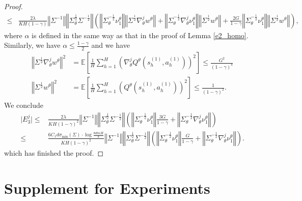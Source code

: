 \documentclass{article}
\numberwithin{equation}{section}
\begin{document}
\begin{proof}
\begin{align*}
    \leq&\frac{2\lambda}{KH(1-\gamma)}\left\Vert\Sigma^{-1}\right\Vert\left\Vert\Sigma_\theta^{\frac{1}{2}}\Sigma^{-\frac{1}{2}}\right\Vert\left(\left\Vert\Sigma_\theta^{-\frac{1}{2}}\nu^\theta_1\right\Vert\left\Vert\Sigma^{\frac{1}{2}}\nabla_\theta^j w^\theta\right\Vert+\left\Vert\Sigma_\theta^{-\frac{1}{2}}\nabla_\theta^j\nu^\theta_1\right\Vert\left\Vert\Sigma^{\frac{1}{2}}w^\theta\right\Vert+\frac{2G}{1-\gamma}\left\Vert\Sigma_\theta^{-\frac{1}{2}}\nu^\theta_1\right\Vert\left\Vert\Sigma^{\frac{1}{2}}w^\theta\right\Vert\right),
\end{align*}
where $\alpha$ is defined in the same way as that in the proof of Lemma \ref{e2_homo}. Similarly, we have $\alpha\leq\frac{1-\gamma}{2}$ and we have
\begin{align*}
    \left\Vert\Sigma^{\frac{1}{2}}\nabla_\theta^j w^\theta\right\Vert^2&=\mathbb{E}\left[\frac{1}{H}\sum_{h=1}^H\left(\nabla_\theta^j Q^\theta\left(s_h^{(1)},a_h^{(1)}\right)\right)^2\right]\leq \frac{G^2}{(1-\gamma)^4}\\
    \left\Vert\Sigma^{\frac{1}{2}}w^\theta\right\Vert^2&=\mathbb{E}\left[\frac{1}{H}\sum_{h=1}^H\left(Q^\theta\left(s_h^{(1)},a_h^{(1)}\right)\right)^2\right]\leq\frac{1}{(1-\gamma)^2}.
\end{align*}
We conclude
\begin{align*}
    \vert E_3^j\vert\leq&\frac{2\lambda}{KH(1-\gamma)^2}\left\Vert\Sigma^{-1}\right\Vert\left\Vert\Sigma_\theta^{\frac{1}{2}}\Sigma^{-\frac{1}{2}}\right\Vert\left(\left\Vert\Sigma_\theta^{-\frac{1}{2}}\nu^\theta_1\right\Vert\frac{3G}{1-\gamma}+\left\Vert\Sigma_\theta^{-\frac{1}{2}}\nabla_\theta^j\nu^\theta_1\right\Vert\right)\\
    \leq&\frac{6C_1d\sigma_{\textrm{min}}(\Sigma)\cdot\log\frac{8dmH}{\delta}
}{KH(1-\gamma)^2}\left\Vert\Sigma^{-1}\right\Vert\left\Vert\Sigma_\theta^{\frac{1}{2}}\Sigma^{-\frac{1}{2}}\right\Vert\left(\left\Vert\Sigma_\theta^{-\frac{1}{2}}\nu^\theta_1\right\Vert\frac{G}{1-\gamma}+\left\Vert\Sigma_\theta^{-\frac{1}{2}}\nabla_\theta^j\nu^\theta_1\right\Vert\right).
\end{align*}
which has finished the proof. 
\end{proof}

\section{Supplement for Experiments}
\label{exp_appendix}
\end{document}
